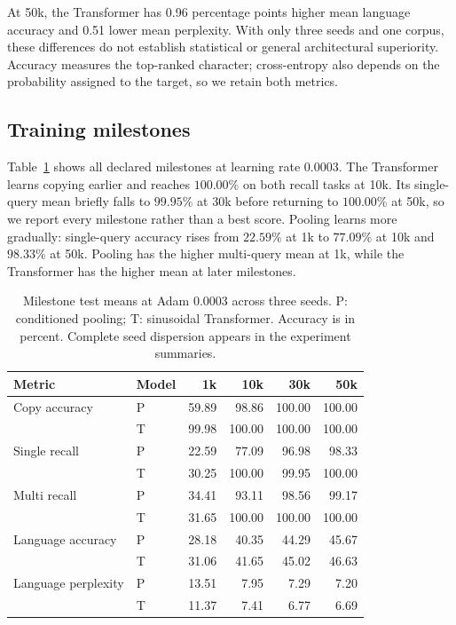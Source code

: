 \documentclass[11pt]{article}
\begin{document}
At 50k, the Transformer has 0.96 percentage points higher mean language accuracy and 0.51 lower mean perplexity. With only three seeds and one corpus, these differences do not establish statistical or general architectural superiority. Accuracy measures the top-ranked character; cross-entropy also depends on the probability assigned to the target, so we retain both metrics.

\subsection{Training milestones}
Table~\ref{tab:trajectory} shows all declared milestones at learning rate 0.0003. The Transformer learns copying earlier and reaches $100.00\%$ on both recall tasks at 10k. Its single-query mean briefly falls to $99.95\%$ at 30k before returning to $100.00\%$ at 50k, so we report every milestone rather than a best score. Pooling learns more gradually: single-query accuracy rises from $22.59\%$ at 1k to $77.09\%$ at 10k and $98.33\%$ at 50k. Pooling has the higher multi-query mean at 1k, while the Transformer has the higher mean at later milestones.

\begin{table}[htbp]
\centering\small
\caption{Milestone test means at Adam 0.0003 across three seeds. P: conditioned pooling; T: sinusoidal Transformer. Accuracy is in percent. Complete seed dispersion appears in the experiment summaries.}
\label{tab:trajectory}
\begin{tabular}{llrrrr}
\toprule
Metric & Model & 1k & 10k & 30k & 50k\\
\midrule
Copy accuracy & P & 59.89 & 98.86 & 100.00 & 100.00\\
 & T & 99.98 & 100.00 & 100.00 & 100.00\\
Single recall & P & 22.59 & 77.09 & 96.98 & 98.33\\
 & T & 30.25 & 100.00 & 99.95 & 100.00\\
Multi recall & P & 34.41 & 93.11 & 98.56 & 99.17\\
 & T & 31.65 & 100.00 & 100.00 & 100.00\\
Language accuracy & P & 28.18 & 40.35 & 44.29 & 45.67\\
 & T & 31.06 & 41.65 & 45.02 & 46.63\\
Language perplexity & P & 13.51 & 7.95 & 7.29 & 7.20\\
 & T & 11.37 & 7.41 & 6.77 & 6.69\\
\bottomrule
\end{tabular}
\end{table}
\end{document}
